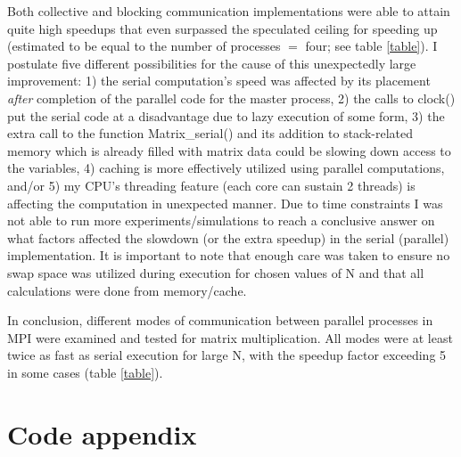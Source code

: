 \documentclass[12pt]{report}
\begin{document}
Both collective and blocking communication implementations were able to attain quite high speedups that even surpassed the speculated ceiling for speeding up (estimated to be equal to the number of processes $=$ four; see table \ref{table}). I postulate five different possibilities for the cause of this unexpectedly large improvement: 1) the serial computation's speed was affected by its placement \emph{after} completion of the parallel code for the master process, 2) the calls to clock() put the serial code at a disadvantage due to lazy execution of some form, 3) the extra call to the function Matrix\_serial() and its addition to stack-related memory which is already filled with matrix data could be slowing down access to the variables, 4) caching is more effectively utilized using parallel computations, and/or 5) my CPU's threading feature (each core can sustain 2 threads) is affecting the computation in unexpected manner. Due to time constraints I was not able to run more experiments/simulations to reach a conclusive answer on what factors affected the slowdown (or the extra speedup) in the serial (parallel) implementation. It is important to note that enough care was taken to ensure no swap space was utilized during execution for chosen values of N and that all calculations were done from memory/cache.

In conclusion, different modes of communication between parallel processes in MPI were examined and tested for matrix multiplication. All modes were at least twice as fast as serial execution for large N, with the speedup factor exceeding 5 in some cases (table \ref{table}).  

\appendix
\chapter*{Code appendix}






\end{document}
